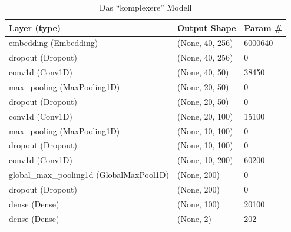 \begin{table}[h]
    \caption{Das \enquote{komplexere} Modell}
    \label{modellBesch2}
    \renewcommand{\arraystretch}{1.2}
    \centering
    \sffamily
    \begin{footnotesize}
        \begin{tabular}{l l l}
            \toprule
            \textbf{Layer (type)}                  & \textbf{Output Shape} & \textbf{Param \#} \\
            \midrule
            embedding (Embedding)  & (None, 40, 256) & 6000640                \\
            dropout (Dropout)  & (None, 40, 256) &     0      \\
            conv1d (Conv1D)                  & (None, 40, 50)     &    38450     \\
            max\_pooling (MaxPooling1D)                  & (None, 20, 50)     &0     \\
            dropout (Dropout)  & (None, 20, 50) &     0      \\
            conv1d (Conv1D)                  & (None, 20, 100)     &    15100     \\
            max\_pooling (MaxPooling1D)                  & (None, 10, 100)     &0     \\
            dropout (Dropout)  & (None, 10, 100) &     0      \\
            conv1d (Conv1D)                  & (None, 10, 200)     &    60200     \\
            global\_max\_pooling1d (GlobalMaxPool1D)   & (None, 200)                    &     0   \\
            dropout (Dropout)  & (None, 200) &     0      \\
            dense (Dense)    & (None, 100)     &  20100      \\
            dense (Dense)   & (None, 2)     & 202                      \\
            \bottomrule
        \end{tabular}
    \end{footnotesize}
    \rmfamily
\end{table}

